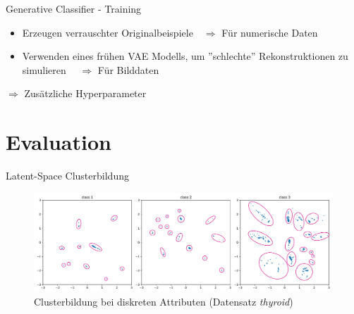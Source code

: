 \documentclass[10pt, compress]{beamer}
\begin{document}
\begin{frame}{Generative Classifier - Training}
  \begin{itemize}
    \item Erzeugen verrauschter Originalbeispiele \,\, {\color{mDarkTeal} $\Rightarrow$ Für numerische Daten}
    \item Verwenden eines frühen VAE Modells, um ''schlechte'' Rekonstruktionen zu simulieren \,\,\,\, {\color{mDarkTeal} $\Rightarrow$ Für Bilddaten}
  \end{itemize}
  $\Rightarrow$ Zusätzliche Hyperparameter
\end{frame}


\section{Evaluation}

\begin{frame}{Latent-Space Clusterbildung}
  \begin{minipage}[c]{\textwidth}
    \begin{figure}[hbt]
    \centering
    \includegraphics[width=\textwidth]{gfx/evaluation/feature_space/discrete_problem_with_cluster}
    \caption{Clusterbildung bei diskreten Attributen (Datensatz \textit{thyroid})}
    \end{figure}
  \end{minipage}
\end{frame}
\end{document}
